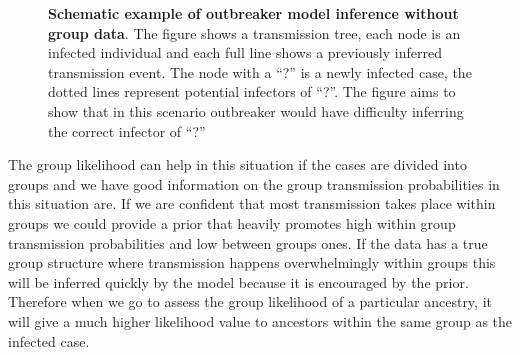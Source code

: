 \documentclass[11pt,a4paper]{report}
\begin{document}
\begin{figure}[h!]
\centering
{} \newline

\caption{{\bf Schematic example of outbreaker model inference without group data}. The figure shows a transmission tree, each node is an infected individual and each full line shows a previously inferred transmission event. The node with a ``?'' is a newly infected case, the dotted lines represent potential infectors of ``?''. The figure aims to show that in this scenario outbreaker would have difficulty inferring the correct infector of ``?''}
\end{figure}
The group likelihood can help in this situation if the cases are divided into groups and we have good information on the group transmission probabilities in this situation are. If we are confident that most transmission takes place within groups we could provide a prior that heavily promotes high within group transmission probabilities and low between groups ones. If the data has a true group structure where transmission happens overwhelmingly within groups this will be inferred quickly by the model because it is encouraged by the prior. Therefore when we go to assess the group likelihood of a particular ancestry, it will give a much higher likelihood value to ancestors within the same group as the infected case. 
\end{document}
